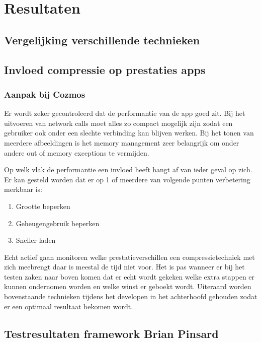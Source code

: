
\chapter{Resultaten}
\label{ch:resultaten}

\section{Vergelijking verschillende technieken}
\label{sec:technieken}



\section{Invloed compressie op prestaties apps}
\label{sec:invloedcompressie}
\subsection{Aanpak bij Cozmos}
Er wordt zeker gecontroleerd dat de performantie van de app goed zit. Bij het uitvoeren van network calls moet alles zo compact mogelijk zijn zodat een gebruiker ook onder een slechte verbinding kan blijven werken. Bij het tonen van meerdere afbeeldingen is het memory management zeer belangrijk om onder andere out of memory exceptions te vermijden. 

Op welk vlak de performantie een invloed heeft hangt af van ieder geval op zich. Er kan gesteld worden dat er op 1 of meerdere van volgende punten verbetering merkbaar is:
\begin{enumerate}
	\setlength\itemsep{2em}
\item Grootte beperken
\item Geheugengebruik beperken
\item Sneller laden
\end{enumerate}
Echt actief gaan monitoren welke prestatieverschillen een compressietechniek met zich meebrengt  daar is meestal de tijd niet voor. Het is pas wanneer er bij het testen zaken naar boven komen dat er echt wordt gekeken welke extra stappen er kunnen ondernomen worden en welke winst er geboekt wordt. Uiteraard worden bovenstaande technieken tijdens het developen in het achterhoofd gehouden zodat er een optimaal resultaat bekomen wordt.

 \section{Testresultaten framework Brian Pinsard}
\label{sec:invloedcompressie}